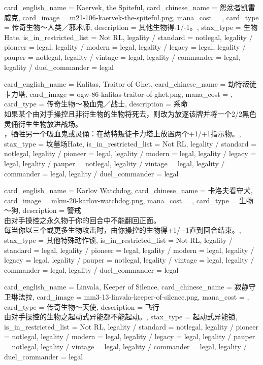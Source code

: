 \documentclass[lang = cn, color = black, 10pt]{AllThatStax}
\begin{document}
\card
{
	card_english_name = {Kaervek, the Spiteful},
	card_chinese_name = {怨忿者凯雷威克},
	card_image = m21-106-kaervek-the-spiteful.png,
	mana_cost = ,
	card_type = 传奇生物～人类／邪术师,
	description = {其他生物得-1/-1。},
	stax_type = 生物Hate,
	is_in_restricted_list = Not RL,
	legality / standard = notlegal,
	legality / pioneer = legal,
	legality / modern = legal,
	legality / legacy = legal,
	legality / pauper = notlegal,
	legality / vintage = legal,
	legality / commander = legal,
	legality / duel_commander = legal
}

\card
{
	card_english_name = {Kalitas, Traitor of Ghet},
	card_chinese_name = {劫特叛徒卡力塔},
	card_image = ogw-86-kalitas-traitor-of-ghet.png,
	mana_cost = ,
	card_type = 传奇生物～吸血鬼／战士,
	description = {系命\\
如果某个由对手操控且非衍生物的生物将死去，则改为放逐该牌并将一个2/2黑色灵俑衍生生物放进战场。\\
，牺牲另一个吸血鬼或灵俑：在劫特叛徒卡力塔上放置两个+1/+1指示物。},
	stax_type = 坟墓场Hate,
	is_in_restricted_list = Not RL,
	legality / standard = notlegal,
	legality / pioneer = legal,
	legality / modern = legal,
	legality / legacy = legal,
	legality / pauper = notlegal,
	legality / vintage = legal,
	legality / commander = legal,
	legality / duel_commander = legal
}

\card
{
	card_english_name = {Karlov Watchdog},
	card_chinese_name = {卡洛夫看守犬},
	card_image = mkm-20-karlov-watchdog.png,
	mana_cost = ,
	card_type = 生物～狗,
	description = {警戒\\
由对手操控之永久物于你的回合中不能翻回正面。\\
每当你以三个或更多生物攻击时，由你操控的生物得+1/+1直到回合结束。},
	stax_type = 其他特殊动作锁,
	is_in_restricted_list = Not RL,
	legality / standard = legal,
	legality / pioneer = legal,
	legality / modern = legal,
	legality / legacy = legal,
	legality / pauper = notlegal,
	legality / vintage = legal,
	legality / commander = legal,
	legality / duel_commander = legal
}

\card
{
	card_english_name = {Linvala, Keeper of Silence},
	card_chinese_name = {寂静守卫琳法拉},
	card_image = mm3-13-linvala-keeper-of-silence.png,
	mana_cost = ,
	card_type = 传奇生物～天使,
	description = {飞行\\
由对手操控的生物之起动式异能都不能起动。},
	stax_type = 起动式异能锁,
	is_in_restricted_list = Not RL,
	legality / standard = notlegal,
	legality / pioneer = notlegal,
	legality / modern = legal,
	legality / legacy = legal,
	legality / pauper = notlegal,
	legality / vintage = legal,
	legality / commander = legal,
	legality / duel_commander = legal
}
\end{document}
